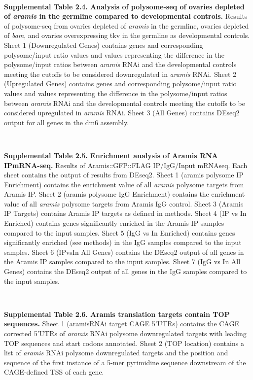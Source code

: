 \documentclass[12pt,oneside]{reedthesis}
\begin{document}
\textbf{\\
}

\textbf{Supplemental Table 2.4. Analysis of polysome-seq of ovaries depleted of \emph{aramis} in the germline compared to developmental controls.}
Results of polysome-seq from ovaries depleted of \emph{aramis} in the germline, ovaries depleted of \emph{bam}, and ovaries overexpressing tkv in the germline as developmental controls. Sheet 1 (Downregulated Genes) contains genes and corresponding polysome/input ratio values and values representing the difference in the polysome/input ratios between \emph{aramis} RNAi and the developmental controls meeting the cutoffs to be considered downregulated in \emph{aramis} RNAi. Sheet 2 (Upregulated Genes) contains genes and corresponding polysome/input ratio values and values representing the difference in the polysome/input ratios between \emph{aramis} RNAi and the developmental controls meeting the cutoffs to be considered upregulated in \emph{aramis} RNAi. Sheet 3 (All Genes) contains DEseq2 output for all genes in the dm6 assembly.

\textbf{\\
}

\textbf{Supplemental Table 2.5. Enrichment analysis of Aramis RNA IPmRNA-seq.}
Results of Aramis::GFP::FLAG IP/IgG/Input mRNAseq. Each sheet contains the output of results from DEseq2. Sheet 1 (aramis polysome IP Enrichment) contains the enrichment value of all \emph{aramis} polysome targets from Aramis IP. Sheet 2 (aramis polysome IgG Enrichment) contains the enrichment value of all \emph{aramis} polysome targets from Aramis IgG control. Sheet 3 (Aramis IP Targets) contains Aramis IP targets as defined in methods. Sheet 4 (IP vs In Enriched) contains genes significantly enriched in the Aramis IP samples compared to the input samples. Sheet 5 (IgG vs In Enriched) contains genes significantly enriched (see methods) in the IgG samples compared to the input samples. Sheet 6 (IPvsIn All Genes) contains the DEseq2 output of all genes in the Aramis IP samples compared to the input samples. Sheet 7 (IgG vs In All Genes) contains the DEseq2 output of all genes in the IgG samples compared to the input samples.

\textbf{\\
}

\textbf{Supplemental Table 2.6. Aramis translation targets contain TOP sequences.}
Sheet 1 (aramisRNAi target CAGE 5'UTRs) contains the CAGE corrected 5'UTRs of \emph{aramis} RNAi polysome downregulated targets with leading TOP sequences and start codons annotated. Sheet 2 (TOP location) contains a list of \emph{aramis} RNAi polysome downregulated targets and the position and sequence of the first instance of a 5-mer pyrimidine sequence downstream of the CAGE-defined TSS of each gene.
\end{document}
